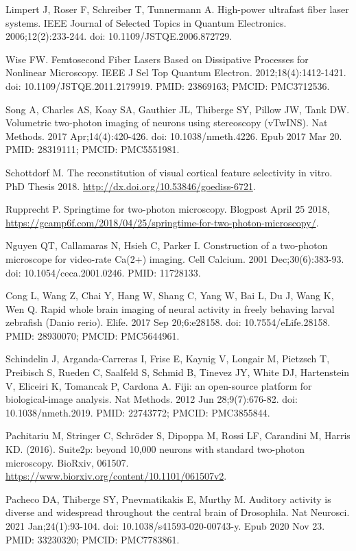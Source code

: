 \documentclass[10pt,letterpaper]{article}
\begin{document}
\begin{thebibliography}{10}
Limpert J, Roser F, Schreiber T, Tunnermann A. High-power ultrafast fiber laser systems. IEEE Journal of Selected Topics in Quantum Electronics. 2006;12(2):233-244. doi: 10.1109/JSTQE.2006.872729.

Wise FW. Femtosecond Fiber Lasers Based on Dissipative Processes for Nonlinear Microscopy. IEEE J Sel Top Quantum Electron. 2012;18(4):1412-1421. doi: 10.1109/JSTQE.2011.2179919. PMID: 23869163; PMCID: PMC3712536.

Song A, Charles AS, Koay SA, Gauthier JL, Thiberge SY, Pillow JW, Tank DW. Volumetric two-photon imaging of neurons using stereoscopy (vTwINS). Nat Methods. 2017 Apr;14(4):420-426. doi: 10.1038/nmeth.4226. Epub 2017 Mar 20. PMID: 28319111; PMCID: PMC5551981.

Schottdorf M. The reconstitution of visual cortical feature selectivity in vitro. PhD Thesis 2018. \url{http://dx.doi.org/10.53846/goediss-6721}.

Rupprecht P. Springtime for two-photon microscopy. Blogpost April 25 2018, \url{https://gcamp6f.com/2018/04/25/springtime-for-two-photon-microscopy/}.

Nguyen QT, Callamaras N, Hsieh C, Parker I. Construction of a two-photon microscope for video-rate Ca(2+) imaging. Cell Calcium. 2001 Dec;30(6):383-93. doi: 10.1054/ceca.2001.0246. PMID: 11728133.

Cong L, Wang Z, Chai Y, Hang W, Shang C, Yang W, Bai L, Du J, Wang K, Wen Q. Rapid whole brain imaging of neural activity in freely behaving larval zebrafish (Danio rerio). Elife. 2017 Sep 20;6:e28158. doi: 10.7554/eLife.28158. PMID: 28930070; PMCID: PMC5644961.

Schindelin J, Arganda-Carreras I, Frise E, Kaynig V, Longair M, Pietzsch T, Preibisch S, Rueden C, Saalfeld S, Schmid B, Tinevez JY, White DJ, Hartenstein V, Eliceiri K, Tomancak P, Cardona A. Fiji: an open-source platform for biological-image analysis. Nat Methods. 2012 Jun 28;9(7):676-82. doi: 10.1038/nmeth.2019. PMID: 22743772; PMCID: PMC3855844.

Pachitariu M, Stringer C, Schröder S, Dipoppa M, Rossi LF, Carandini M, Harris KD. (2016). Suite2p: beyond 10,000 neurons with standard two-photon microscopy. BioRxiv, 061507. \url{https://www.biorxiv.org/content/10.1101/061507v2}.

Pacheco DA, Thiberge SY, Pnevmatikakis E, Murthy M. Auditory activity is diverse and widespread throughout the central brain of Drosophila. Nat Neurosci. 2021 Jan;24(1):93-104. doi: 10.1038/s41593-020-00743-y. Epub 2020 Nov 23. PMID: 33230320; PMCID: PMC7783861.


\end{thebibliography}
\end{document}
